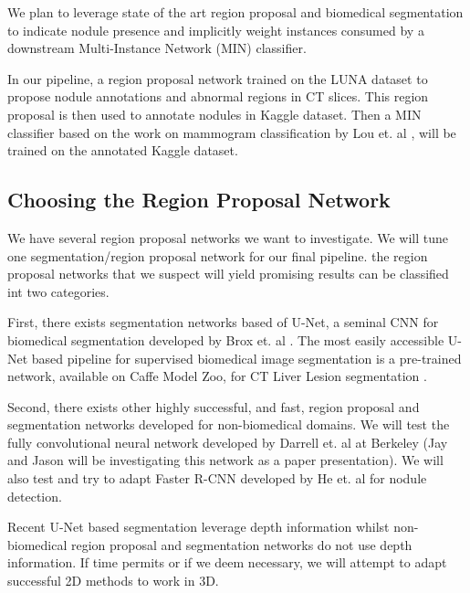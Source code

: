 \documentclass[twocolumn,10pt]{article}
\begin{document}
We plan to leverage state of the art region proposal and biomedical segmentation
to indicate nodule presence and implicitly weight instances consumed by a 
downstream Multi-Instance Network (MIN) classifier.

In our pipeline, a region proposal network trained on the LUNA dataset to propose
nodule annotations and abnormal regions in CT slices. This region proposal 
is then used to annotate nodules in Kaggle dataset. Then a MIN classifier based 
on the work on mammogram  classification by Lou et. al \cite{DBLP:journals/corr/ZhuLVX16},
will be trained on the annotated Kaggle dataset.

\subsection{Choosing the Region Proposal Network}
We have several region proposal networks we want to investigate.
We will tune one segmentation/region proposal network for our final pipeline. 
the region proposal networks that we suspect will yield promising results can 
be classified int two categories.

First, there exists segmentation networks based of U-Net, a seminal CNN for biomedical
segmentation developed by Brox et. al \cite{U-net_2015}. The most easily accessible
U-Net based pipeline for supervised biomedical image segmentation is 
a pre-trained network, available on Caffe Model Zoo, for CT Liver Lesion 
segmentation \cite{DBLP:journals/corr/ChristEETBBRAHD16}.

Second, there exists other highly successful, and fast, region proposal and 
segmentation networks developed for non-biomedical domains. We
will test the fully convolutional neural network developed by Darrell et. al at
Berkeley \cite{long_shelhamer_fcn} (Jay and Jason will be investigating this network as a paper 
presentation). We will also test and try to adapt Faster R-CNN developed by He 
et. al \cite{fast_rcnn_2015, faster_rcnn_2015} for nodule detection.

Recent U-Net based segmentation leverage depth information whilst non-biomedical
region proposal and segmentation networks do not use depth information. If time permits or
if we deem necessary, we will attempt to adapt successful 2D methods to work in 3D. 


\end{document}
